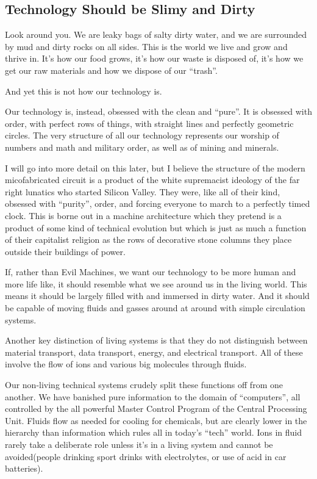 \subsection{Technology Should be Slimy and
Dirty}\label{technology-should-be-slimy-and-dirty}

Look around you. We are leaky bags of salty dirty water, and we are
surrounded by mud and dirty rocks on all sides. This is the world we
live and grow and thrive in. It's how our food grows, it's how our waste
is disposed of, it's how we get our raw materials and how we dispose of
our ``trash''.

And yet this is not how our technology is.

Our technology is, instead, obsessed with the clean and ``pure''. It is
obsessed with order, with perfect rows of things, with straight lines
and perfectly geometric circles. The very structure of all our
technology represents our worship of numbers and math and military
order, as well as of mining and minerals.

I will go into more detail on this later, but I believe the structure of
the modern micofabricated circuit is a product of the white supremacist
ideology of the far right lunatics who started Silicon Valley. They
were, like all of their kind, obsessed with ``purity'', order, and
forcing everyone to march to a perfectly timed clock. This is borne out
in a machine architecture which they pretend is a product of some kind
of technical evolution but which is just as much a function of their
capitalist religion as the rows of decorative stone columns they place
outside their buildings of power.

If, rather than Evil Machines, we want our technology to be more human
and more life like, it should resemble what we see around us in the
living world. This means it should be largely filled with and immersed
in dirty water. And it should be capable of moving fluids and gasses
around at around with simple circulation systems.

Another key distinction of living systems is that they do not
distinguish between material transport, data transport, energy, and
electrical transport. All of these involve the flow of ions and various
big molecules through fluids.

Our non-living technical systems crudely split these functions off from
one another. We have banished pure information to the domain of
``computers'', all controlled by the all powerful Master Control Program
of the Central Processing Unit. Fluids flow as needed for cooling for
chemicals, but are clearly lower in the hierarchy than information which
rules all in today's ``tech'' world. Ions in fluid rarely take a
deliberate role unless it's in a living system and cannot be
avoided(people drinking sport drinks with electrolytes, or use of acid
in car batteries).

